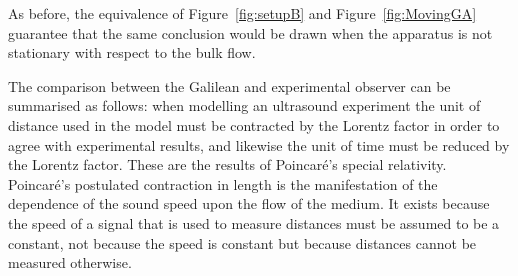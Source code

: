\documentclass[10pt, fleqn,final,showtrims,oldfontcommands, article,a4paper,oneside]{memoir} %
\newcommand{\eqnref}[1]{\ref{eqn:#1}}
\newcommand{\figref}[1]{Figure~\ref{fig:#1}}
\newcommand{\Poincare}{Poincar{\'e}\xspace}
\begin{document}

As before, the equivalence of \figref{setupB} and \figref{MovingGA} guarantee that the same conclusion 
would be drawn when the apparatus is not stationary with respect to the bulk flow.

The comparison between the Galilean and experimental observer can be summarised as follows:
when modelling an ultrasound experiment 
the  unit of distance used in the model must be
contracted by the Lorentz factor in order to agree with experimental results,
and likewise the unit of time must be reduced by the Lorentz factor.
These are the results of \Poincare's special relativity.
\Poincare's postulated contraction in length is the manifestation of the dependence of the sound speed upon
the flow of the medium.
It  exists because  the speed of a  signal that is used to measure distances must be assumed to be a constant,
not because the speed is constant but because distances cannot be measured otherwise.



%
%
%
%
\end{document}
